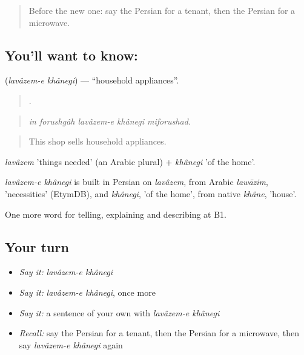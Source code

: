 \begin{quote}
Before the new one: say the Persian for a tenant, then the Persian for a microwave.
\end{quote}

\subsection*{You'll want to know:  }
\textbf{ } (\emph{lavâzem-e khânegi}) — \textquotedblleft{}household appliances\textquotedblright{}.

\begin{quote}
    .
\end{quote}

\begin{quote}
\emph{in forushgâh lavâzem-e khânegi miforushad.}
\end{quote}

\begin{quote}
This shop sells household appliances.
\end{quote}

\emph{lavâzem} 'things needed' (an Arabic plural) + \emph{khânegi} 'of the home'.

\begin{cousinweb}
\emph{lavâzem-e khânegi} is built in Persian on \emph{lavâzem}, from Arabic \emph{lawāzim}, 'necessities' (EtymDB), and \emph{khânegi}, 'of the home', from native \emph{khâne}, 'house'.
\end{cousinweb}

\begin{grammarlens}[title={What you've built}]
One more word for telling, explaining and describing at B1.
\end{grammarlens}

\subsection*{Your turn}
\begin{itemize}
\raggedright
  \item \emph{Say it:} \emph{lavâzem-e khânegi}
  \item \emph{Say it:} \emph{lavâzem-e khânegi}, once more
  \item \emph{Say it:} a sentence of your own with \emph{lavâzem-e khânegi}
  \item \emph{Recall:} say the Persian for a tenant, then the Persian for a microwave, then say \emph{lavâzem-e khânegi} again
\end{itemize}

